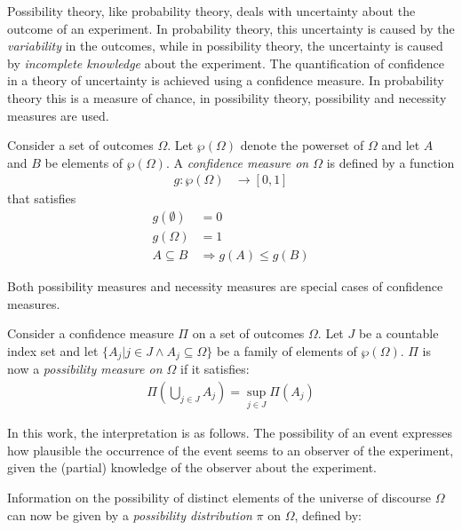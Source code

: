 Possibility theory, like probability theory, deals with uncertainty about the outcome of an experiment. In probability theory, this uncertainty is caused by the \emph{variability} in the outcomes, while in possibility theory, the uncertainty is caused by \emph{incomplete knowledge} about the experiment. The quantification of confidence in a theory of uncertainty is achieved using a confidence measure\cite{Pon11}. In probability theory this is a measure of chance, in possibility theory, possibility and necessity measures are used.

\begin{definition}
Consider a set of outcomes $\Omega$. Let $\wp(\Omega)$ denote the powerset of $\Omega$ and let $A$ and $B$ be elements of $\wp(\Omega)$. A \emph{confidence measure on $\Omega$} is defined by a function
	\begin{align}
	g : \wp(\Omega) & \rightarrow \left[0,1\right]
	\end{align}
that satisfies
	\begin{align}
	g(\emptyset) &= 0 \\
	g(\Omega) &= 1 	\label{NormalizationProperty} \\
	A \subseteq B &\Rightarrow g(A) \leq g(B) \label{MonotonicityProperty}
	\end{align}
\end{definition}

Both possibility measures and necessity measures are special cases of confidence measures.

\begin{definition}
Consider a confidence measure $\Pi$ on a set of outcomes $\Omega$. Let $J$ be a countable index set and let $\{ A_{j} | j \in J \wedge A_{j} \subseteq \Omega \}$ be a family of elements of $\wp(\Omega)$. $\Pi$ is now a \emph{possibility measure on $\Omega$} if it satisfies:
	\begin{align}
	\Pi\left(\bigcup_{j \in J} A_{j} \right) = \sup_{j \in J} \Pi(A_{j})
	\end{align}
\end{definition}

In this work, the interpretation is as follows. The possibility of an event expresses how plausible the occurrence of the event seems to an observer of the experiment, given the (partial) knowledge of the observer about the experiment.

Information on the possibility of distinct elements of the universe of discourse $\Omega$ can now be given by a \emph{possibility distribution} $\pi$ on $\Omega$, defined by:

